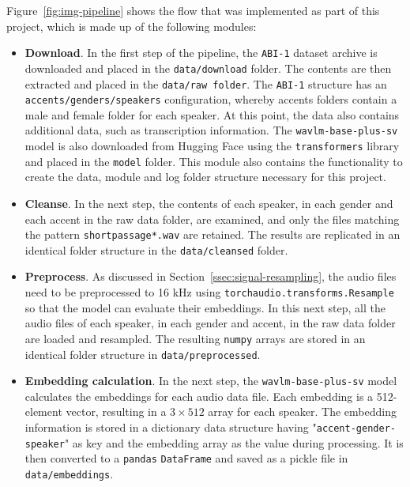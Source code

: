 \documentclass[conference]{IEEEtran}
\begin{document}
	Figure~\ref{fig:img-pipeline} shows the flow that was implemented as part of this project, which is made up of the following modules:
	
	\begin{itemize}
		\item \textbf{Download}. In the first step of the pipeline, the \texttt{ABI-1} dataset archive is downloaded and placed in the \texttt{data/download} folder. The contents are then extracted and placed in the \texttt{data/raw folder}. The \texttt{ABI-1} structure has an \texttt{accents/genders/speakers} configuration, whereby accents folders contain a male and female folder for each speaker. At this point, the data also contains additional data, such as transcription information.
		The \texttt{wavlm-base-plus-sv} model is also downloaded from Hugging Face using the \texttt{transformers} library and placed in the \texttt{model} folder.
		This module also contains the functionality to create the data, module and log folder structure necessary for this project.
		
		\item \textbf{Cleanse}. In the next step, the contents of each speaker, in each gender and each accent in the raw data folder, are examined, and only the files matching the pattern \texttt{shortpassage*.wav} are retained. The results are replicated in an identical folder structure in the \texttt{data/cleansed} folder.
		
		\item \textbf{Preprocess}. As discussed in Section~\ref{ssec:signal-resampling}, the audio files need to be preprocessed to 16 kHz using \texttt{torchaudio.transforms.Resample} so that the model can evaluate their embeddings. In this next step, all the audio files of each speaker, in each gender and accent, in the raw data folder are loaded and resampled. The resulting \texttt{numpy} arrays are stored in an identical folder structure in \texttt{data/preprocessed}.
		
		\item \textbf{Embedding calculation}. In the next step, the \texttt{wavlm-base-plus-sv} model calculates the embeddings for each audio data file. Each embedding is a 512-element vector, resulting in a $3 \times 512$ array for each speaker. The embedding information is stored in a dictionary data structure having "\texttt{accent-gender-speaker}" as key and the embedding array as the value during processing. It is then converted to a \texttt{pandas} \texttt{DataFrame} and saved as a pickle file in \texttt{data/embeddings}.
		

\end{itemize}
\end{document}
